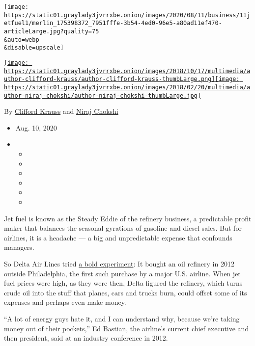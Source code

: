 \texttt{[image: https://static01.graylady3jvrrxbe.onion/images/2020/08/11/business/11jetfuel1/merlin\_175398372\_7951fffe-3b54-4ed0-96e5-a80ad11ef470-articleLarge.jpg?quality=75\\\&auto=webp\\\&disable=upscale]}

\href{https://www.nytimes3xbfgragh.onion/by/clifford-krauss}{\texttt{[image: https://static01.graylady3jvrrxbe.onion/images/2018/10/17/multimedia/author-clifford-krauss/author-clifford-krauss-thumbLarge.png]}}\href{https://www.nytimes3xbfgragh.onion/by/niraj-chokshi}{\texttt{[image: https://static01.graylady3jvrrxbe.onion/images/2018/02/20/multimedia/author-niraj-chokshi/author-niraj-chokshi-thumbLarge.jpg]}}

By \href{https://www.nytimes3xbfgragh.onion/by/clifford-krauss}{Clifford
Krauss} and
\href{https://www.nytimes3xbfgragh.onion/by/niraj-chokshi}{Niraj
Chokshi}

\begin{itemize}
\item
  Aug. 10, 2020
\item
  \begin{itemize}
  \item
  \item
  \item
  \item
  \item
  \item
  \end{itemize}
\end{itemize}

Jet fuel is known as the Steady Eddie of the refinery business, a
predictable profit maker that balances the seasonal gyrations of
gasoline and diesel sales. But for airlines, it is a headache --- a big
and unpredictable expense that confounds managers.

So Delta Air Lines tried
\href{https://www.nytimes3xbfgragh.onion/2012/04/05/business/deltas-puzzling-interest-in-buying-an-oil-refinery.html}{a
bold experiment}: It bought an oil refinery in 2012 outside
Philadelphia, the first such purchase by a major U.S. airline. When jet
fuel prices were high, as they were then, Delta figured the refinery,
which turns crude oil into the stuff that planes, cars and trucks burn,
could offset some of its expenses and perhaps even make money.

``A lot of energy guys hate it, and I can understand why, because we're
taking money out of their pockets,'' Ed Bastian, the airline's current
chief executive and then president, said at an industry conference in
2012.

